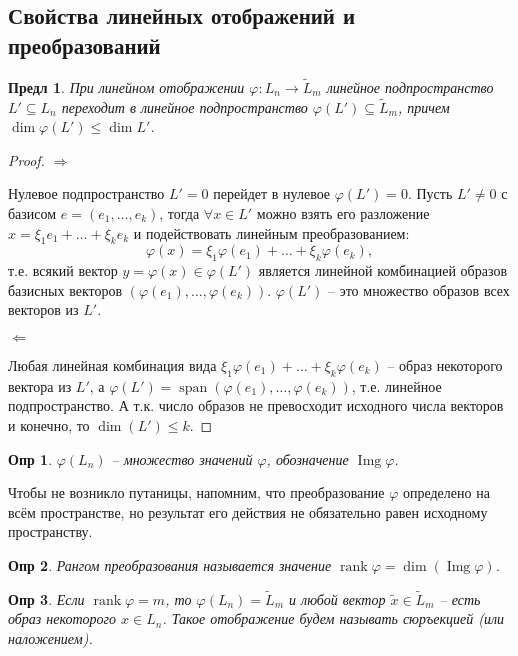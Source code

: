 \documentclass[a4paper,12pt]{article}
\DeclareMathOperator{\img}{\mathop{Img}}
\DeclareMathOperator{\spn}{\mathop{span}}
\DeclareMathOperator{\rank}{\mathop{rank}}
\newtheorem*{definition}{Опр}
\newtheorem{propos}{Предл}[section]
\begin{document}
\subsection{Свойства линейных отображений и преобразований}
\begin{propos}
	При линейном отображении $\varphi: L_n \to \tilde{L}_m$ линейное подпространство $L' \subseteq L_n$ переходит в линейное подпространство $\varphi(L') \subseteq \tilde{L}_m$, причем $\dim \varphi(L') \le \dim L'$.
\end{propos}

\begin{proof} $\Rightarrow$ 
	
	Нулевое подпространство $L' = 0$ перейдет в нулевое $\varphi(L') = 0$.	Пусть $L' \ne 0$ с базисом $e = (e_1, \ldots, e_k)$, тогда $\forall x \in L'$ можно взять его разложение $x = \xi_1 e_1 + \ldots + \xi_k e_k$ и подействовать линейным преобразованием: 
	\[
		\varphi(x) = \xi_1 \varphi(e_1) + \ldots + \xi_k \varphi(e_k), 		
	\]
	т.е. всякий вектор $y = \varphi(x) \in \varphi(L')$ является линейной комбинацией образов базисных векторов $(\varphi(e_1), \ldots, \varphi(e_k))$. $\varphi(L')$ -- это множество образов всех векторов из $L'$.
	
	$\Leftarrow$
	
	Любая линейная комбинация вида $\xi_1 \varphi(e_1) + \ldots + \xi_k \varphi(e_k)$ -- образ некоторого вектора из $L'$, а $\varphi(L') = \spn(\varphi(e_1), \ldots, \varphi(e_k))$, т.е. линейное подпространство. А т.к. число образов не превосходит исходного числа векторов и конечно, то $\dim(L') \le k$.	
\end{proof}

\begin{definition}
	$\varphi(L_n)$ -- множество значений $\varphi$, обозначение $\img \varphi$.
\end{definition}

Чтобы не возникло путаницы, напомним, что преобразование $\varphi$ определено на всём пространстве, но результат его действия не обязательно равен исходному пространству.

\begin{definition}
	Рангом преобразования называется значение $\rank \varphi = \dim(\img \varphi)$.	
\end{definition}

\begin{definition}
Если $\rank \varphi = m$, то $\varphi(L_n) = \tilde{L}_m$ и любой вектор $\tilde{x} \in \tilde{L}_m$ -- есть образ некоторого $x \in L_n$. Такое отображение будем называть сюръекцией (или наложением).
\end{definition}
\end{document}
